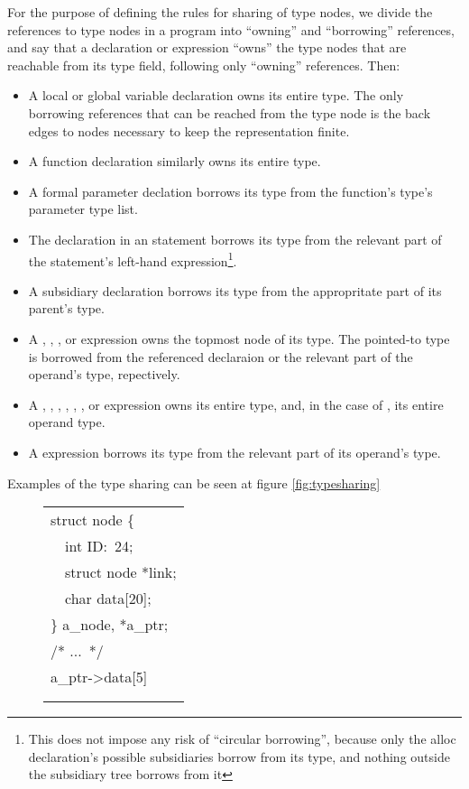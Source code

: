 \begin{docpart}
For the purpose of defining the rules for sharing of type nodes, we
divide the references to type nodes in a program into ``owning'' and
``borrowing'' references, and say that a declaration or expression
``owns'' the type nodes that are reachable from its type field,
following only ``owning'' references. Then:
\begin{itemize}
\item A local or global variable declaration owns its
        entire type. The only borrowing references that can be
        reached from the type node is the back edges to
         nodes necessary to keep the
        representation finite.
\item A function declaration similarly owns its entire type.
\item A formal parameter declation borrows
        its type from the function's type's parameter type list.
\item The declaration in an  statement borrows its
        type from the relevant part of the statement's left-hand
        expression\footnote{This does not impose any risk of
                ``circular borrowing'', because only the
                alloc declaration's possible subsidiaries
                borrow from its type, and nothing outside the
                subsidiary tree borrows from it}.
\item A subsidiary declaration borrows
        its type from the appropritate part of its parent's type.
\item A , , , or  expression
        owns the topmost  node of its type. The
        pointed-to type is borrowed from the referenced declaraion
        or the relevant part of the operand's type, repectively.
\item A , , , ,
        , , or 
        expression owns its entire type, and, in the case of
        , its entire operand type.
\item A  expression borrows its type from the
        relevant part of its operand's type.
\end{itemize}

Examples of the type sharing can be seen at figure \ref{fig:typesharing}

\begin{figure}[htbp]
  \begin{center}
     \ttfamily
     \begin{tabular}{l}
        struct node \{ \\
        ~~int ID:~24; \\
        ~~struct node *link; \\
        ~~char data[20]; \\
        \} a\_node, *a\_ptr; \\
        /* ...~*/ \\
        a\_ptr->data[5] \\
        \\
        \\
     \end{tabular}


\end{center}
\end{figure}
\end{docpart}
